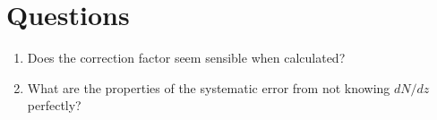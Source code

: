 \documentclass[onecolumn,amsmath,aps,fleqn, superscriptaddress]{revtex4}
\begin{document}
\section*{Questions}
\begin{enumerate}
\item{Does the correction factor seem sensible when calculated?}
\item{What are the properties of the systematic error from not knowing $dN/dz$ perfectly?}
\end{enumerate}


\end{document}
